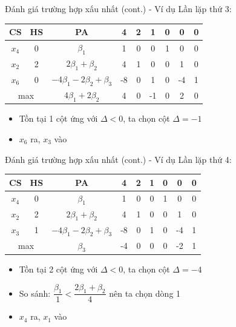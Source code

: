 \documentclass[10pt]{beamer}
\begin{document}
\begin{frame}{Đánh giá trường hợp xấu nhất (cont.) - Ví dụ}
Lần lặp thứ 3:
\begin{table}[H]
\centering
\begin{tabular}{|c|c|c|c|c|c|c|c|c|}
\hline
CS & HS & PA & 4 & 2 & 1 & 0 & 0 & 0 \\
\hline
$x_4$ & 0 & $\beta_1$ & 1 & 0 & 0 & 1 & 0 & 0 \\
$x_2$ & 2 & $2\beta_1 + \beta_2$ & 4 & 1 & 0 & 0 & 1 & 0 \\
$x_6$ & 0 & $-4\beta_1 - 2\beta_2 + \beta_3$ & -8 & 0 & 1 & 0 & -4 & 1 \\
\hline
\multicolumn{2}{|c|}{max}
& $4\beta_1 + 2\beta_2$ & 4 & 0 & -1 & 0 & 2 & 0 \\
\hline
\end{tabular}
\end{table}
\begin{itemize}
\item Tồn tại 1 cột ứng với $\Delta < 0$, ta chọn cột $\Delta = -1$
\item $x_6$ ra, $x_3$ vào
\end{itemize}
\end{frame}

\begin{frame}{Đánh giá trường hợp xấu nhất (cont.) - Ví dụ}
Lần lặp thứ 4:
\begin{table}[H]
\centering
\begin{tabular}{|c|c|c|c|c|c|c|c|c|}
\hline
CS & HS & PA & 4 & 2 & 1 & 0 & 0 & 0 \\
\hline
$x_4$ & 0 & $\beta_1$ & 1 & 0 & 0 & 1 & 0 & 0 \\
$x_2$ & 2 & $2\beta_1 + \beta_2$ & 4 & 1 & 0 & 0 & 1 & 0 \\
$x_3$ & 1 & $-4\beta_1 - 2\beta_2 + \beta_3$ & -8 & 0 & 1 & 0 & -4 & 1 \\
\hline
\multicolumn{2}{|c|}{max}
& $\beta_3$ & -4 & 0 & 0 & 0 & -2 & 1 \\
\hline
\end{tabular}
\end{table}
\begin{itemize}
\item Tồn tại 2 cột ứng với $\Delta < 0$, ta chọn cột $\Delta = -4$
\item So sánh: $\dfrac{\beta_1}{1} < \dfrac{2\beta_1 + \beta_2}{4}$ nên ta chọn dòng 1
\item $x_4$ ra, $x_1$ vào
\end{itemize}
\end{frame}
\end{document}
